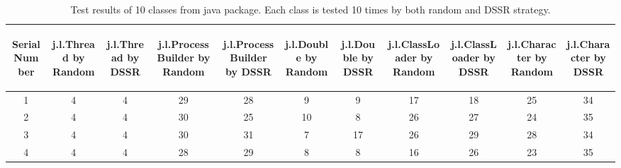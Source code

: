\begin{table}[ht]
\caption{Test results of 10 classes from java package. Each class is tested 10 times by both random and DSSR strategy.} %
\centering %

\begin{tabular}{| c | c | c | c | c | c | c | c | c | c | c |} %
\hline\hline %
 \begin{sideways} Serial Number \end{sideways} & \begin{sideways} j.l.Thread by Random \end{sideways} &  \begin{sideways} j.l.Thread by DSSR \end{sideways} &  \begin{sideways} j.l.ProcessBuilder by Random \end{sideways} &  \begin{sideways} j.l.ProcessBuilder by DSSR \end{sideways} &  \begin{sideways} j.l.Double by Random \end{sideways} & \begin{sideways} j.l.Double by DSSR \end{sideways} &  \begin{sideways} j.l.ClassLoader by Random \end{sideways} &  \begin{sideways} j.l.ClassLoader by DSSR \end{sideways} & \begin{sideways} j.l.Character by Random \end{sideways} & \begin{sideways} j.l.Character by DSSR \end{sideways} \\ [0.5ex] %
\hline %
1 & 4 & 4 & 29 & 28 & 9 & 9 & 17 & 18 & 25 & 34\\ %

2 & 4 & 4 & 30 & 25 & 10 & 8 & 26 & 27 & 24 & 35\\

3 & 4 & 4 & 30 & 31 & 7 & 17 & 26 & 29 & 28 & 34\\

4 & 4 & 4 & 28 & 29 & 8 & 8 & 16 & 26 & 23 & 35\\


\end{tabular}
\end{table}
